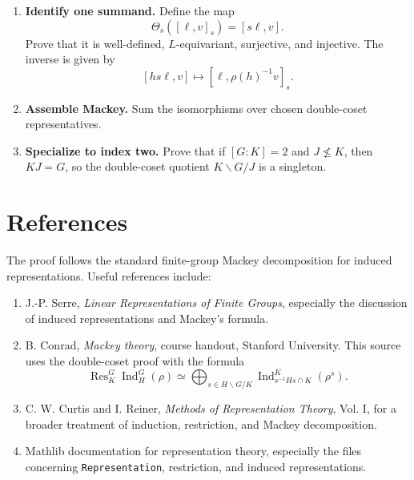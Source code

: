 \documentclass[11pt]{article}
\theoremstyle{definition}
\newcommand{\Ind}{\operatorname{Ind}}
\newcommand{\Res}{\operatorname{Res}}
\begin{document}
\begin{enumerate}[label=\textbf{Step \arabic*.},wide]
  \item \textbf{Identify one summand.}
  Define the map
  \[
    \Theta_s([\ell,v]_s)=[s\ell,v].
  \]
  Prove that it is well-defined, $L$-equivariant, surjective, and injective. The inverse is given by
  \[
    [hs\ell,v]\mapsto [\ell,\rho(h)^{-1}v]_s.
  \]

  \item \textbf{Assemble Mackey.}
  Sum the isomorphisms over chosen double-coset representatives.

  \item \textbf{Specialize to index two.}
  Prove that if $[G:K]=2$ and $J\not\leq K$, then $KJ=G$, so the double-coset quotient $K\backslash G/J$ is a singleton.
\end{enumerate}

\section{References}

The proof follows the standard finite-group Mackey decomposition for induced representations. Useful references include:

\begin{enumerate}
  \item J.-P. Serre, \emph{Linear Representations of Finite Groups}, especially the discussion of induced representations and Mackey's formula.
  \item B. Conrad, \emph{Mackey theory}, course handout, Stanford University. This source uses the double-coset proof with the formula
  \[
    \Res_K^G\Ind_H^G(\rho)
    \simeq
    \bigoplus_{s\in H\backslash G/K}
    \Ind_{s^{-1}Hs\cap K}^{K}(\rho^s).
  \]
  \item C. W. Curtis and I. Reiner, \emph{Methods of Representation Theory}, Vol. I, for a broader treatment of induction, restriction, and Mackey decomposition.
  \item Mathlib documentation for representation theory, especially the files concerning \texttt{Representation}, restriction, and induced representations.
\end{enumerate}
\end{document}

